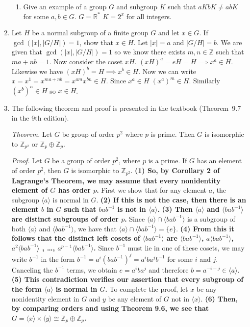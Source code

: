 \documentclass{article}
\newcommand{\ZZ}{\mathbb{Z}}
\newcommand{\inv}{^{-1}}
\newcommand{\iso}{\cong}
\begin{document}
\begin{enumerate}
\begin{enumerate}
    
        \item Give an example of a group $G$ and subgroup $K$ such that $aKbK\ne abK$ for some $a,b\in G$. $G = \mathbb{R}^{*}$ $K= 2^{x}$ for all integers.  

        
    \end{enumerate} 
    
    
\item Let $H$ be a normal subgroup of a finite group $G$ and let $x\in G$. If $\gcd(|x|, |G/H|)=1$, show that $x\in H$. Let $|x| =a$ and $|G/H|=b$. We are given that $\gcd(|x|, |G/H|)=1$ so we know there exists $m,n \in \mathbb{Z}$ such that $ma + nb =1$. Now consider the coset $xH$.  $(xH)^{a} = eH = H \implies x^{a} \in H$. Likewise we have $(xH)^{b} = H \implies x^{b} \in H$. Now we can write $x = x^{1} = x^{ma+nb} = x^{am} x^{bn} \in H$. Since $x^{a} \in H$ $(x^{a})^{m} \in H$. Similarly $(x^{b})^{n} \in H$ so $x \in H$. 
    
    
\item The following theorem and proof is presented in the textbook (Theorem~9.7 in the 9th edition).
    
    \bigskip
    {\sffamily
    \textit{Theorem. }
    Let $G$ be group of order $p^2$ where $p$ is prime. Then $G$ is isomorphic to $\ZZ_{p^2}$ or $\ZZ_p\oplus \ZZ_p$.

    \textit{Proof.}
    Let $G$ be a group of order $p^2$, where $p$ is a prime. If $G$ has an element of order $p^2$, then $G$ is isomorphic to $\ZZ_{p^2}$.
    \textbf{(1) So, by Corollary 2 of Lagrange’s Theorem, we may assume that every nonidentity element of $G$ has order $p$. }
    First we show that for any element $a$, the subgroup $\langle a\rangle$ is normal in $G$. 
    \textbf{(2) If this is not the case, then there is an element $b$ in $G$ such that $bab\inv$ is not in $\langle a\rangle$.}
    \textbf{(3) Then $\langle a\rangle$ and $\langle bab\inv\rangle$ are distinct subgroups of order $p$.}
    Since $\langle a\rangle\cap\langle bab\inv\rangle$ is a subgroup of both $\langle a\rangle$ and $\langle bab\inv\rangle$, we have that $\langle a\rangle\cap\langle bab\inv\rangle=\{e\}$. 
    \textbf{(4) From this it follows that the distinct left cosets of $\langle bab\inv\rangle$ are $\langle bab\inv\rangle$, $a\langle bab\inv\rangle$, $a^2\langle bab\inv\rangle$ , \dots, $a^{p-1}\langle bab\inv\rangle$.} 
    Since $b\inv$ must lie in one of these cosets, we may write $b\inv$ in the form $b\inv=a^i(bab\inv)^j=a^iba^jb\inv$ for some $i$ and $j$. 
    Canceling the $b\inv$ terms, we obtain $e=a^iba^j$ and therefore $b=a^{-i-j}\in\langle a\rangle$. 
    \textbf{(5) This contradiction verifies our assertion that every subgroup of the form $\langle a\rangle$ is normal in $G$. }
    To complete the proof, let $x$ be any nonidentity element in $G$ and $y$ be any element of $G$ not in $\langle x\rangle$.
    \textbf{(6) Then, by comparing orders and using Theorem 9.6, we see that $G=\langle x\rangle\times\langle y\rangle\iso \ZZ_p\oplus\ZZ_p$.}
    }
    \bigskip
    

\end{enumerate}
\end{document}
